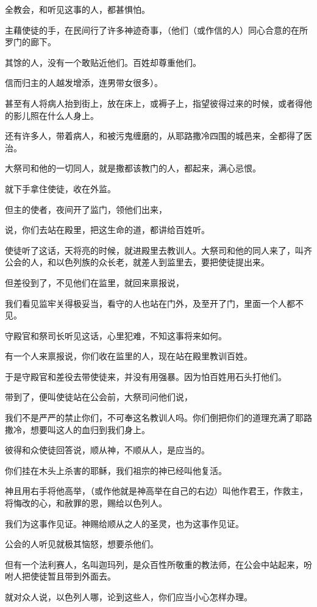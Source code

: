 \documentclass[12pt,oneside]{book}
\begin{document}
全教会，和听见这事的人，都甚惧怕。

主藉使徒的手，在民间行了许多神迹奇事，（他们（或作信的人）同心合意的在所罗门的廊下。

其馀的人，没有一个敢贴近他们。百姓却尊重他们。

信而归主的人越发增添，连男带女很多）。

甚至有人将病人抬到街上，放在床上，或褥子上，指望彼得过来的时候，或者得他的影儿照在什么人身上。

还有许多人，带着病人，和被污鬼缠磨的，从耶路撒冷四围的城邑来，全都得了医治。

大祭司和他的一切同人，就是撒都该教门的人，都起来，满心忌恨。

就下手拿住使徒，收在外监。

但主的使者，夜间开了监门，领他们出来，

说，你们去站在殿里，把这生命的道，都讲给百姓听。

使徒听了这话，天将亮的时候，就进殿里去教训人。大祭司和他的同人来了，叫齐公会的人，和以色列族的众长老，就差人到监里去，要把使徒提出来。

但差役到了，不见他们在监里，就回来禀报说，

我们看见监牢关得极妥当，看守的人也站在门外，及至开了门，里面一个人都不见。

守殿官和祭司长听见这话，心里犯难，不知这事将来如何。

有一个人来禀报说，你们收在监里的人，现在站在殿里教训百姓。

于是守殿官和差役去带使徒来，并没有用强暴。因为怕百姓用石头打他们。

带到了，便叫使徒站在公会前，大祭司问他们说，

我们不是严严的禁止你们，不可奉这名教训人吗。你们倒把你们的道理充满了耶路撒冷，想要叫这人的血归到我们身上。

彼得和众使徒回答说，顺从神，不顺从人，是应当的。

你们挂在木头上杀害的耶稣，我们祖宗的神已经叫他复活。

神且用右手将他高举，（或作他就是神高举在自己的右边）叫他作君王，作救主，将悔改的心，和赦罪的恩，赐给以色列人。

我们为这事作见证。神赐给顺从之人的圣灵，也为这事作见证。

公会的人听见就极其恼怒，想要杀他们。

但有一个法利赛人，名叫迦玛列，是众百性所敬重的教法师，在公会中站起来，吩咐人把使徒暂且带到外面去。

就对众人说，以色列人哪，论到这些人，你们应当小心怎样办理。
\end{document}
